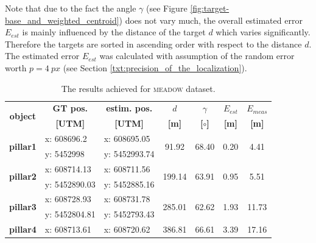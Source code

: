 Note that due to the fact the angle $\gamma$ (see Figure \ref{fig:target-base_and_weighted_centroid}) does not vary much, the overall estimated error $E_{est}$ is mainly influenced by the distance of the target $d$ which varies significantly. Therefore the targets are sorted in ascending order with respect to the distance $d$. The estimated error $E_{est}$ was calculated with assumption of the random error worth $p = 4~px$ (see Section \ref{txt:precision_of_the_localization}). 

\begin{table}[!h]
	\centering
	\caption{The results achieved for \textsc{meadow} dataset.}
	\begin{tabular}{crrcccc}
		\toprule
		\multirow{2}[0]{*}{\textbf{object}} & \multicolumn{1}{c}{\textbf{GT pos.}} & \multicolumn{1}{c}{\textbf{estim. pos. }} & \textbf{$d$} & \textbf{$\gamma$} & \textbf{$E_{est}$} & \textbf{$E_{meas}$} \\
		\textbf{} & \multicolumn{1}{c}{\textbf{[UTM]}} & \multicolumn{1}{c}{\textbf{[UTM]}} & \textbf{[m]} & \textbf{[$\circ$]} & \textbf{[m]} & \textbf{[m]} \\
		\midrule
		\multirow{2}[0]{*}{\textbf{pillar1}} & \multicolumn{1}{l}{x: 608696.2} & \multicolumn{1}{l}{x: 608695.05} & \multirow{2}[0]{*}{91.92} & \multirow{2}[0]{*}{68.40} & \multirow{2}[0]{*}{0.20} & \multirow{2}[0]{*}{4.41} \\
		& \multicolumn{1}{l}{y: 5452998} & \multicolumn{1}{l}{y: 5452993.74} &       &       &       &  \\
		\multirow{2}[0]{*}{\textbf{pillar2}} & \multicolumn{1}{l}{x: 608714.13} & \multicolumn{1}{l}{x: 608711.56} & \multirow{2}[0]{*}{199.14} & \multirow{2}[0]{*}{63.91} & \multirow{2}[0]{*}{0.95} & \multirow{2}[0]{*}{5.51} \\
		& \multicolumn{1}{l}{y: 5452890.03} & \multicolumn{1}{l}{y: 5452885.16} &       &       &       &  \\
		\multirow{2}[0]{*}{\textbf{pillar3}} & \multicolumn{1}{l}{x: 608728.93} & \multicolumn{1}{l}{x: 608731.78} & \multirow{2}[0]{*}{285.01} & \multirow{2}[0]{*}{62.62} & \multirow{2}[0]{*}{1.93} & \multirow{2}[0]{*}{11.73} \\
		& \multicolumn{1}{l}{y: 5452804.81} & \multicolumn{1}{l}{y: 5452793.43} &       &       &       &  \\
		\multirow{2}[0]{*}{\textbf{pillar4}} & \multicolumn{1}{l}{x: 608713.61} & \multicolumn{1}{l}{x: 608720.62} & \multirow{2}[0]{*}{386.81} & \multirow{2}[0]{*}{66.61} & \multirow{2}[0]{*}{3.39} & \multirow{2}[0]{*}{17.16} \\

\end{tabular}
\end{table}
